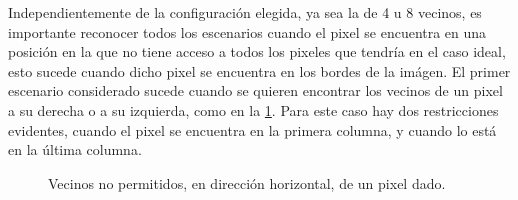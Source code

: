 \begin{enumerate}
\begin{solution}
        Independientemente de la configuración elegida, ya sea la de 4 u 8 vecinos, es importante reconocer todos los escenarios cuando el pixel se encuentra en una posición en la que no tiene acceso a todos los pixeles que tendría en el caso ideal, esto sucede cuando dicho pixel se encuentra en los bordes de la imágen. El primer escenario considerado sucede cuando se quieren encontrar los vecinos de un pixel a su derecha o a su izquierda, como en la \cref{fig:vecinos_horizontal}. Para este caso hay dos restricciones evidentes, cuando el pixel se encuentra en la primera columna, y cuando lo está en la última columna.
        \begin{figure}[ht!]
            \centering
            \caption{Vecinos no permitidos, en dirección horizontal, de un pixel dado.}
            \label{fig:vecinos_horizontal}
        \end{figure}


\end{solution}
\end{enumerate}
